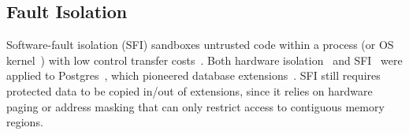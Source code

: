 \subsection{Fault Isolation}
\label{sec:sfi}

Software-fault isolation (SFI) sandboxes untrusted code within a
process (or OS kernel~\cite{lcds,vino,nooks}) with low control transfer costs~\cite{wedge,vx32,pnacl,sfi-cisc,nacl}.
Both hardware isolation~\cite{write-protect-db} and SFI~\cite{efficient-sfi}
were applied to Postgres~\cite{postgres}, which pioneered
database extensions~\cite{postgres-extensions}.  SFI still requires protected
data to be copied in/out of extensions, since it relies on hardware
paging or address masking that can only restrict access to contiguous memory
regions.



